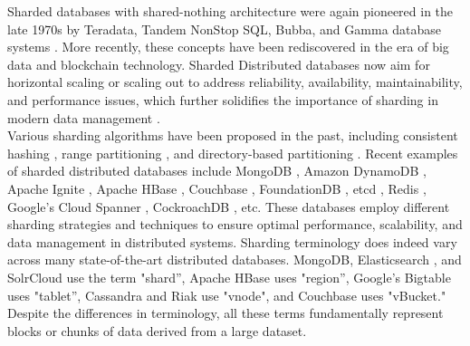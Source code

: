 \noindent Sharded databases with shared-nothing architecture were again pioneered in the late 1970s by Teradata, Tandem NonStop SQL, Bubba, and Gamma database systems \cite{stonebraker1986case, KAMAL2016421}. More recently, these concepts have been rediscovered in the era of big data and blockchain technology. Sharded Distributed databases now aim for horizontal scaling or scaling out to address reliability, availability, maintainability, and performance issues, which further solidifies the importance of sharding in modern data management \cite{dewitt1992parallel, mcsherry2015scalability}. \\

\noindent Various sharding algorithms have been proposed in the past, including consistent hashing \cite{karger1997consistent}, range partitioning \cite{curino2010schism}, and directory-based partitioning \cite{mahmud2020survey}.
Recent examples of sharded distributed databases include MongoDB \cite{mongodb}, Amazon DynamoDB \cite{sivasubramanian2012amazon}, Apache Ignite \cite{ignite}, Apache HBase \cite{hbase}, Couchbase \cite{couchbase}, FoundationDB \cite{foundation}, etcd \cite{etcd}, Redis \cite{redis}, Google's Cloud Spanner \cite{spanner}, CockroachDB \cite{cockroach}, etc. These databases employ different sharding strategies and techniques to ensure optimal performance, scalability, and data management in distributed systems. Sharding terminology does indeed vary across many state-of-the-art distributed databases. MongoDB, Elasticsearch \cite{elasticsearch}, and SolrCloud \cite{solrcloud} use the term "shard”, Apache HBase uses "region”, Google’s Bigtable \cite{chang2008bigtable} uses "tablet”, Cassandra \cite{cassandra2014apache} and Riak \cite{klophaus2010riak} use "vnode", and Couchbase uses "vBucket." Despite the differences in terminology, all these terms fundamentally represent blocks or chunks of data derived from a large dataset. \\

